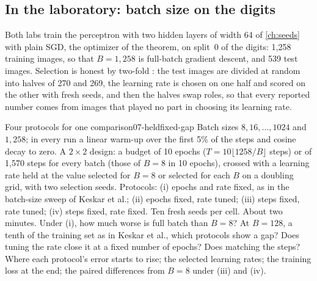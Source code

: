 \begin{refsection}
\section{In the laboratory: batch size on the digits}\label{sec:heldfixed:lab}

Both labs train the perceptron with two hidden layers of width 64 of \cref{ch:seeds} with plain SGD, the optimizer of the theorem, on split~0 of the digits: 1,258 training images, so that $B=1{,}258$ is full-batch gradient descent, and 539 test images. Selection is honest by two-fold : the test images are divided at random into halves of 270 and 269, the learning rate is chosen on one half and scored on the other with fresh seeds, and then the halves swap roles, so that every reported number comes from images that played no part in choosing its learning rate.

\begin{lab}{Four protocols for one comparison}{07-heldfixed-gap}\label{lab:heldfixed:gap}
 Batch sizes $8,16,\dots,1024$ and $1{,}258$; in every run a linear warm-up over the first 5\% of the steps and cosine decay to zero. A $2\times2$ design: a budget of 10 epochs ($T=10\lfloor1258/B\rfloor$ steps) or of 1,570 steps for every batch (those of $B=8$ in 10 epochs), crossed with a learning rate held at the value selected for $B=8$ or selected for each $B$ on a doubling grid, with two selection seeds. Protocols: (i) epochs and rate fixed, as in the batch-size sweep of Keskar et al.; (ii) epochs fixed, rate tuned; (iii) steps fixed, rate tuned; (iv) steps fixed, rate fixed. Ten fresh seeds per cell. About two minutes.
 Under (i), how much worse is full batch than $B=8$? At $B=128$, a tenth of the training set as in Keskar et al., which protocols show a gap? Does tuning the rate close it at a fixed number of epochs? Does matching the steps?
 Where each protocol's error starts to rise; the selected learning rates; the training loss at the end; the paired differences from $B=8$ under (iii) and (iv).
\end{lab}


\end{refsection}
